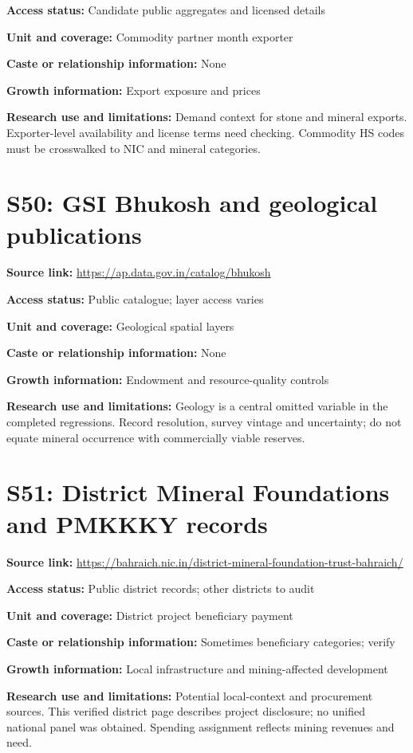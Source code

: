 \documentclass[11pt,a4paper]{report}
\begin{document}
\textbf{Access status:} Candidate public aggregates and licensed details

\textbf{Unit and coverage:} Commodity partner month exporter

\textbf{Caste or relationship information:} None

\textbf{Growth information:} Export exposure and prices

\textbf{Research use and limitations:} Demand context for stone and mineral exports. Exporter-level availability and license terms need checking. Commodity HS codes must be crosswalked to NIC and mineral categories.

\section{S50: GSI Bhukosh and geological publications}\hypertarget{S50}{}
\textbf{Source link:} \url{https://ap.data.gov.in/catalog/bhukosh}

\textbf{Access status:} Public catalogue; layer access varies

\textbf{Unit and coverage:} Geological spatial layers

\textbf{Caste or relationship information:} None

\textbf{Growth information:} Endowment and resource-quality controls

\textbf{Research use and limitations:} Geology is a central omitted variable in the completed regressions. Record resolution, survey vintage and uncertainty; do not equate mineral occurrence with commercially viable reserves.

\section{S51: District Mineral Foundations and PMKKKY records}\hypertarget{S51}{}
\textbf{Source link:} \url{https://bahraich.nic.in/district-mineral-foundation-trust-bahraich/}

\textbf{Access status:} Public district records; other districts to audit

\textbf{Unit and coverage:} District project beneficiary payment

\textbf{Caste or relationship information:} Sometimes beneficiary categories; verify

\textbf{Growth information:} Local infrastructure and mining-affected development

\textbf{Research use and limitations:} Potential local-context and procurement sources. This verified district page describes project disclosure; no unified national panel was obtained. Spending assignment reflects mining revenues and need.
\end{document}
